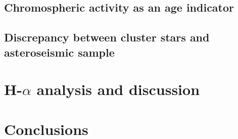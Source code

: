 \subsection{Chromospheric activity as an age indicator}









\subsection{Discrepancy between cluster stars and asteroseismic sample}









\section{H-$\alpha$ analysis and discussion}
\label{Chp4_halpha}








\section{Conclusions}







